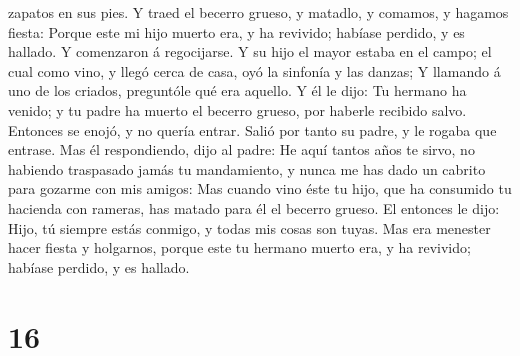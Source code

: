 zapatos en sus pies.  Y traed el becerro grueso, y
matadlo, y comamos, y hagamos fiesta:  Porque este mi
hijo muerto era, y ha revivido; habíase perdido, y es hallado. Y
comenzaron á regocijarse.  Y su hijo el mayor estaba en
el campo; el cual como vino, y llegó cerca de casa, oyó la sinfonía y
las danzas;  Y llamando á uno de los criados, preguntóle
qué era aquello.  Y él le dijo: Tu hermano ha venido; y
tu padre ha muerto el becerro grueso, por haberle recibido salvo.
 Entonces se enojó, y no quería entrar. Salió por tanto
su padre, y le rogaba que entrase.  Mas él respondiendo,
dijo al padre: He aquí tantos años te sirvo, no habiendo traspasado
jamás tu mandamiento, y nunca me has dado un cabrito para gozarme con
mis amigos:  Mas cuando vino éste tu hijo, que ha
consumido tu hacienda con rameras, has matado para él el becerro grueso.
 El entonces le dijo: Hijo, tú siempre estás conmigo, y
todas mis cosas son tuyas.  Mas era menester hacer fiesta
y holgarnos, porque este tu hermano muerto era, y ha revivido; habíase
perdido, y es hallado.

\hypertarget{section-15}{%
\section{16}\label{section-15}}

